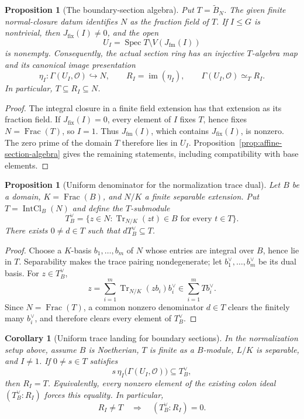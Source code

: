 \documentclass[11pt]{article}
\newtheorem{proposition}[theorem]{Proposition}
\newtheorem{corollary}[theorem]{Corollary}
\theoremstyle{definition}
\theoremstyle{remark}
\DeclareMathOperator{\Spec}{Spec}
\DeclareMathOperator{\Frac}{Frac}
\begin{document}
\begin{proposition}[The boundary-section algebra]
\label{prop:boundary-section-algebra}
Put \(T=\widetilde B_N\). The given finite normal-closure datum
identifies \(N\) as the fraction field of \(T\). If \(I\leq G\)
is nontrivial, then \(J_{\mathrm{fix}}(I)\ne0\), and the open
\[
  U_I=\Spec T\setminus V(J_{\mathrm{fm}}(I))
\]
is nonempty. Consequently, the actual section ring has an injective
\(T\)-algebra map and its canonical image presentation
\[
  \eta_I:\Gamma(U_I,\mathcal O)\hookrightarrow N,\qquad
  R_I=\operatorname{im}(\eta_I),\qquad
  \Gamma(U_I,\mathcal O)\simeq_T R_I.
\]
In particular, \(T\subseteq R_I\subseteq N\).
\end{proposition}

\begin{proof}
The integral closure in a finite field extension has that extension as
its fraction field. If \(J_{\mathrm{fix}}(I)=0\), every element of
\(I\) fixes \(T\), hence fixes \(N=\Frac(T)\), so \(I=1\).
Thus \(J_{\mathrm{fm}}(I)\), which contains
\(J_{\mathrm{fix}}(I)\), is nonzero. The zero prime of the domain
\(T\) therefore lies in \(U_I\).
Proposition~\ref{prop:affine-section-algebra} gives the remaining
statements, including compatibility with base elements.
\end{proof}

\begin{proposition}[Uniform denominator for the normalization trace dual]
\label{prop:normalization-trace-bound}
Let \(B\) be a domain, \(K=\Frac(B)\), and \(N/K\) a finite separable
extension. Put \(T=\operatorname{IntCl}_B(N)\) and define the
\(T\)-submodule
\[
  T^\vee_B
    =\{z\in N:\operatorname{Tr}_{N/K}(zt)\in B
                      \text{ for every }t\in T\}.
\]
There exists \(0\ne d\in T\) such that \(dT^\vee_B\subseteq T\).
\end{proposition}

\begin{proof}
Choose a \(K\)-basis \(b_1,\dots,b_m\) of \(N\) whose entries are
integral over \(B\), hence lie in \(T\). Separability makes the trace
pairing nondegenerate; let \(b_1^\vee,\dots,b_m^\vee\) be its dual basis.
For \(z\in T^\vee_B\),
\[
  z=\sum_{i=1}^m\operatorname{Tr}_{N/K}(zb_i)b_i^\vee
    \in\sum_{i=1}^m T b_i^\vee.
\]
Since \(N=\Frac(T)\), a common nonzero denominator \(d\in T\)
clears the finitely many \(b_i^\vee\), and therefore clears every
element of \(T^\vee_B\).
\end{proof}

\begin{corollary}[Uniform trace landing for boundary sections]
\label{cor:boundary-trace-landing}
In the normalization setup above, assume \(B\) is Noetherian,
\(T\) is finite as a \(B\)-module, \(L/K\) is separable, and \(I\ne1\).
If \(0\ne s\in T\) satisfies
\[
  s\,\eta_I\bigl(\Gamma(U_I,\mathcal O)\bigr)\subseteq T^\vee_B,
\]
then \(R_I=T\). Equivalently, every nonzero element of the existing
colon ideal \((T^\vee_B:R_I)\) forces this equality. In particular,
\[
  R_I\ne T\quad\Longrightarrow\quad(T^\vee_B:R_I)=0.
\]
\end{corollary}
\end{document}
